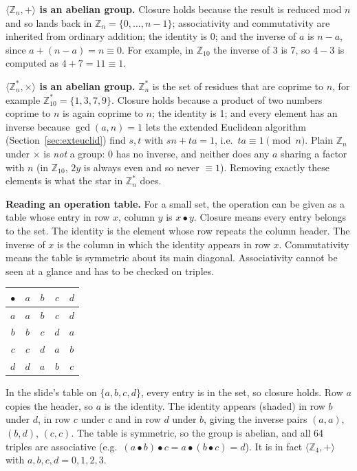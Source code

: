\textbf{$\langle \mathbb{Z}_n, + \rangle$ is an abelian group.} Closure holds because the result is reduced mod $n$ and so lands back in $\mathbb{Z}_n = \{0, \dots, n-1\}$; associativity and commutativity are inherited from ordinary addition; the identity is 0; and the inverse of $a$ is $n - a$, since $a + (n - a) = n \equiv 0$. For example, in $\mathbb{Z}_{10}$ the inverse of 3 is 7, so $4 - 3$ is computed as $4 + 7 = 11 \equiv 1$.

\textbf{$\langle \mathbb{Z}_n^*, \times \rangle$ is an abelian group.} $\mathbb{Z}_n^*$ is the set of residues that are coprime to $n$, for example $\mathbb{Z}_{10}^* = \{1, 3, 7, 9\}$. Closure holds because a product of two numbers coprime to $n$ is again coprime to $n$; the identity is 1; and every element has an inverse because $\gcd(a, n) = 1$ lets the extended Euclidean algorithm (Section~\ref{sec:exteuclid}) find $s, t$ with $sn + ta = 1$, i.e.\ $ta \equiv 1 \pmod n$. Plain $\mathbb{Z}_n$ under $\times$ is \emph{not} a group: 0 has no inverse, and neither does any $a$ sharing a factor with $n$ (in $\mathbb{Z}_{10}$, $2y$ is always even and so never $\equiv 1$). Removing exactly these elements is what the star in $\mathbb{Z}_n^*$ does.

\textbf{Reading an operation table.} For a small set, the operation can be given as a table whose entry in row $x$, column $y$ is $x \bullet y$. Closure means every entry belongs to the set. The identity is the element whose row repeats the column header. The inverse of $x$ is the column in which the identity appears in row $x$. Commutativity means the table is symmetric about its main diagonal. Associativity cannot be seen at a glance and has to be checked on triples.
\begin{center}\small
\begin{minipage}[c]{0.25\textwidth}\centering
\begin{tabular}{c|cccc}
$\bullet$ & $a$ & $b$ & $c$ & $d$\\\hline
$a$ & \cellcolor{gold!25}$a$ & $b$ & $c$ & $d$\\
$b$ & $b$ & $c$ & $d$ & \cellcolor{gold!25}$a$\\
$c$ & $c$ & $d$ & \cellcolor{gold!25}$a$ & $b$\\
$d$ & $d$ & \cellcolor{gold!25}$a$ & $b$ & $c$\\
\end{tabular}
\end{minipage}%
\begin{minipage}[c]{0.72\textwidth}
In the slide's table on $\{a, b, c, d\}$, every entry is in the set, so closure holds. Row $a$ copies the header, so $a$ is the identity. The identity appears (shaded) in row $b$ under $d$, in row $c$ under $c$ and in row $d$ under $b$, giving the inverse pairs $(a, a)$, $(b, d)$, $(c, c)$. The table is symmetric, so the group is abelian, and all 64 triples are associative (e.g.\ $(a \bullet b) \bullet c = a \bullet (b \bullet c) = d$). It is in fact $\langle \mathbb{Z}_4, + \rangle$ with $a, b, c, d = 0, 1, 2, 3$.
\end{minipage}
\end{center}

